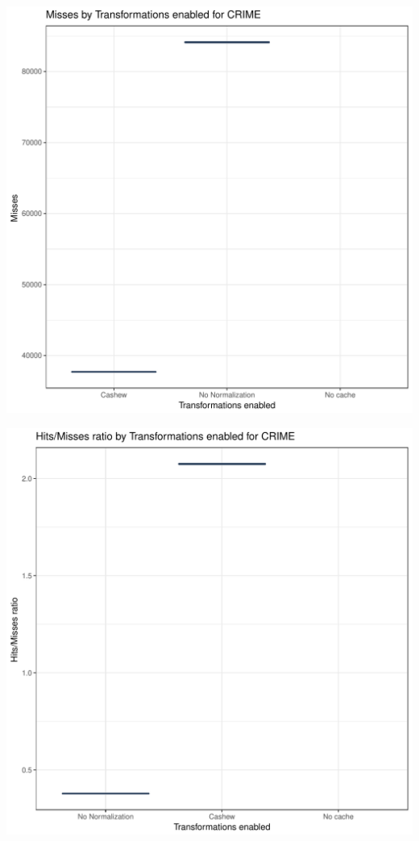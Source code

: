 \documentclass{article}\usepackage[]{graphicx}\usepackage[]{color}
\makeatletter
\def\maxwidth{ %
  \ifdim\Gin@nat@width>\linewidth
    \linewidth
  \else
    \Gin@nat@width
  \fi
}
\newenvironment{knitrout}{}{} %
\makeatother
\begin{document}
\begin{knitrout}
\includegraphics[width=\maxwidth]{figure/crime-3} 

\includegraphics[width=\maxwidth]{figure/crime-4} 

\end{knitrout}
\end{document}
